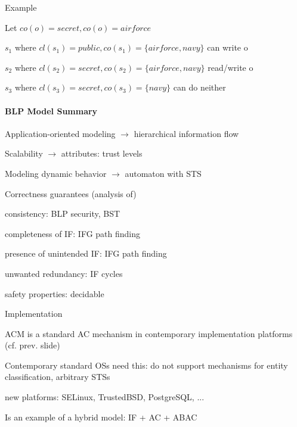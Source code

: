 \documentclass[a4paper]{article}
\begin{document}
\begin{multicols}{3}
    Example
    \begin{itemize*}
        \item Let $co(o)=secret,co(o)=airforce$
        \item $s_1$ where $cl(s_1)=public,co(s_1)=\{airforce,navy\}$ can write o
        \item $s_2$ where $cl(s_2)=secret,co(s_2)=\{airforce,navy\}$ read/write o
        \item $s_3$ where $cl(s_3)=secret,co(s_3)=\{navy\}$ can do neither
    \end{itemize*}


    \paragraph{BLP Model Summary}
    \begin{itemize*}
        \item Application-oriented modeling $\rightarrow$ hierarchical information flow
        \item Scalability $\rightarrow$ attributes: trust levels
        \item Modeling dynamic behavior $\rightarrow$ automaton with STS
        \item Correctness guarantees (analysis of)
        \begin{itemize*}
            \item consistency: BLP security, BST
            \item completeness of IF: IFG path finding
            \item presence of unintended IF: IFG path finding
            \item unwanted redundancy: IF cycles
            \item safety properties: decidable
        \end{itemize*}
        \item Implementation
        \begin{itemize*}
            \item ACM is a standard AC mechanism in contemporary implementation platforms (cf. prev. slide)
            \item Contemporary standard OSs need this: do not support mechanisms for entity classification, arbitrary STSs
            \item new platforms: SELinux, TrustedBSD, PostgreSQL, ...
        \end{itemize*}
        \item Is an example of a hybrid model: IF + AC + ABAC
    \end{itemize*}


\end{multicols}
\end{document}
